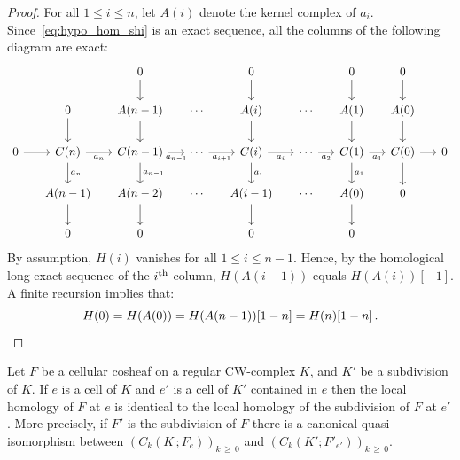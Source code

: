 \documentclass[AHL,Unicode,longabstracts,published]{cedram}
\begin{document}
\begin{proof}
For all $1 \leq i \leq n$, let $A(i)$ denote the kernel complex of $a_i$. Since~\eqref{eq:hypo_hom_shi} is an exact sequence, all the columns of the following diagram are exact:
\begin{equation*}
\begin{tikzcd}[column sep=14]
& & 0 \ar[d] & & 0 \ar[d] & & 0 \ar[d] & 0 \ar[d] \\%
& 0 \ar[d] & A(n-1) \ar[d] & \cdots & A(i) \ar[d] & \cdots & A(1) \ar[d] & A(0) \ar[d] \\%
0 \ar[r] & C(n) \ar[d,"a_n"] \ar[r,"a_n" below] & C(n-1) \ar[d,"a_{n-1}"] \ar[r,"a_{n-1}" below] & \cdots \ar[r,"a_{i+1}" below] & C(i) \ar[d,"a_i"] \ar[r,"a_i" below] & \cdots \ar[r,"a_2" below] & C(1) \ar[d,"a_1"] \ar[r,"a_1"below] & C(0) \ar[d] \ar[r] & 0 \\%
& A(n-1) \ar[d] & A(n-2) \ar[d] & \cdots & A(i-1) \ar[d] & \cdots & A(0) \ar[d] & 0 \\%
& 0 & 0 & & 0 & & 0
\end{tikzcd}
\end{equation*}
By assumption, $H(i)$ vanishes for all $1\leq i\leq n-1$. Hence, by the homological long exact sequence of the $i^{\rm th}$ column, $H(A(i-1))$ equals $H(A(i))[-1]$. A finite recursion implies that:
\begin{equation*}
H(0)=H(A(0))=H(A(n-1))[1-n]=H(n)[1-n]\,.\qedhere
\end{equation*}
\end{proof}

\begin{lemm}\label{lemm:double_loc}
Let $F$ be a cellular cosheaf on a regular CW-complex $K$, and $K'$ be a subdivision of $K$. If $e$ is a cell of $K$ and $e'$ is a cell of $K'$ contained in $e$ then the local homology of $F$ at $e$ is identical to the local homology of the subdivision of $F$ at $e'$. More precisely, if $F'$ is the subdivision of $F$ there is a canonical quasi-isomorphism between $(C_k(K\,; F_e))_{k\,\geq\,0}$ and $(C_k(K' ;F'_{e'}))_{k\,\geq\,0}$.
\end{lemm}
\end{document}
